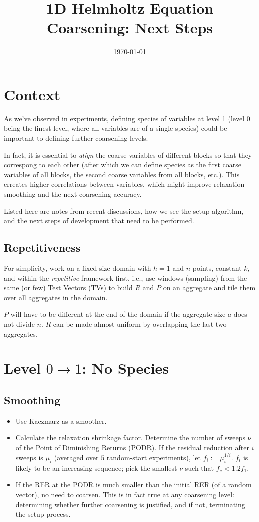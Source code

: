 \documentclass{article}
\title{1D Helmholtz Equation Coarsening: Next Steps}
\author{}
\date{\today}
\begin{document}
\maketitle

\section{Context}
As we've observed in experiments, defining species of variables at level 1 (level 0 being the finest level, where all variables are of a single species) could be important to defining further coarsening levels.

In fact, it is essential to {\it align} the coarse variables of different blocks so that they correspong to each other (after which we can define species as the first coarse variables of all blocks, the second coarse variables from all blocks, etc.). This crreates higher correlations between variables, which might improve relaxation smoothing and the next-coarsening accuracy.

Listed here are notes from recent discussions, how we see the setup algorithm, and the next steps of development that need to be performed.

\subsection{Repetitiveness}
For simplicity, work on a fixed-size domain with $h=1$ and $n$ points, constant $k$, and within the {\it repetitive} framework first, i.e., use windows (sampling) from the same (or few) Test Vectors (TVs) to build $R$ and $P$ on an aggregate and tile them over all aggregates in the domain.

$P$ will have to be different at the end of the domain if the aggregate size $a$ does not divide $n$. $R$ can be made almost uniform by overlapping the last two aggregates.

\section{Level $0 \rightarrow 1$: No Species}

\subsection{Smoothing}
\begin{itemize}
    \item Use Kaczmarz as a smoother.
    \item Calculate the relaxation shrinkage factor. Determine the number of sweeps $\nu$ of the Point of Diminishing Returns (PODR). If the residual reduction after $i$ sweeps is $\mu_i$ (averaged over $5$ random-start experiments), let $f_i := \mu_i^{1/i}$. $f_i$ is likely to be an increasing sequence; pick the smallest $\nu$ such that $f_{\nu} < 1.2 f_1$.
      
    \item If the RER at the PODR is much smaller than the initial RER (of a random vector), no need to coarsen. This is in fact true at any coarsening level: determining whether further coarsening is justified, and if not, terminating the setup process.
\end{itemize}
\end{document}
